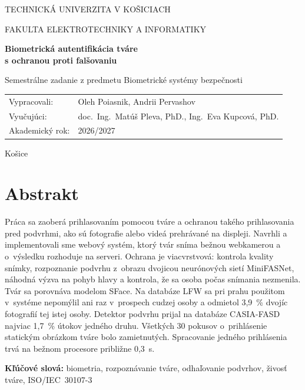 \documentclass[12pt,a4paper,oneside]{report}
\begin{document}
\begin{titlepage}
  \centering
  {\large TECHNICKÁ UNIVERZITA V KOŠICIACH\par}
  {\large FAKULTA ELEKTROTECHNIKY A INFORMATIKY\par}
  \vspace{4cm}
  {\LARGE\bfseries Biometrická autentifikácia tváre\\[4pt] s ochranou proti falšovaniu\par}
  \vspace{1cm}
  {\large Semestrálne zadanie z predmetu Biometrické systémy bezpečnosti\par}
  \vfill
  \begin{flushleft}
    \begin{tabular}{@{}ll}
      Vypracovali: & Oleh Poiasnik, Andrii Pervashov\\
      Vyučujúci:   & doc.~Ing.~Matúš Pleva, PhD., Ing.~Eva Kupcová, PhD.\\
      Akademický rok: & 2026/2027\\
    \end{tabular}
  \end{flushleft}
  \vspace{1cm}
  {Košice \the\year\par}
\end{titlepage}

\chapter*{Abstrakt}

Práca sa zaoberá prihlasovaním pomocou tváre a ochranou takého prihlasovania pred
podvrhmi, ako sú fotografie alebo videá prehrávané na displeji. Navrhli a implementovali
sme webový systém, ktorý tvár sníma bežnou webkamerou a o~výsledku rozhoduje na serveri.
Ochrana je viacvrstvová: kontrola kvality snímky, rozpoznanie podvrhu z~obrazu dvojicou
neurónových sietí MiniFASNet, náhodná výzva na pohyb hlavy a kontrola, že sa osoba počas
snímania nezmenila. Tvár sa porovnáva modelom SFace. Na databáze LFW sa pri prahu
použitom v~systéme nepomýlil ani raz v~prospech cudzej osoby a odmietol 3,9~\% dvojíc
fotografií tej istej osoby. Detektor podvrhu prijal na databáze CASIA-FASD najviac
1,7~\% útokov jedného druhu. Všetkých 30 pokusov o~prihlásenie statickým obrázkom tváre
bolo zamietnutých. Spracovanie jedného prihlásenia trvá na bežnom procesore približne
0,3~s.

\vspace{1em}
\noindent\textbf{Kľúčové slová:} biometria, rozpoznávanie tváre, odhaľovanie podvrhov,
živosť tváre, ISO/IEC~30107-3
\end{document}
